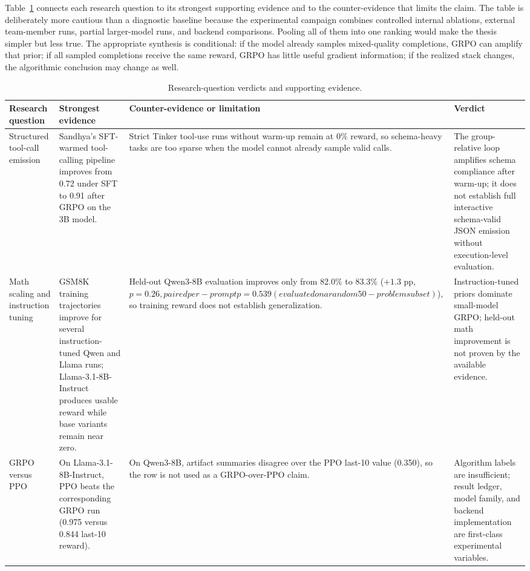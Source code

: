 \documentclass[12pt,a4paper]{report}
\begin{document}
Table~\ref{tab:rq-verdicts} connects each research question to its strongest supporting evidence and to the counter-evidence that limits the claim. The table is deliberately more cautious than a diagnostic baseline because the experimental campaign combines controlled internal ablations, external team-member runs, partial larger-model runs, and backend comparisons. Pooling all of them into one ranking would make the thesis simpler but less true. The appropriate synthesis is conditional: if the model already samples mixed-quality completions, GRPO can amplify that prior; if all sampled completions receive the same reward, GRPO has little useful gradient information; if the realized stack changes, the algorithmic conclusion may change as well.

\begin{table}[ht]
\centering
\caption{Research-question verdicts and supporting evidence.}
\label{tab:rq-verdicts}
\small
\footnotesize
\begin{tabularx}{\textwidth}{p{2.45cm}p{4.05cm}p{4.05cm}X}
\toprule
Research question & Strongest evidence & Counter-evidence or limitation & Verdict\\
\midrule
Structured tool-call emission & Sandhya's SFT-warmed tool-calling pipeline improves from 0.72 under SFT to 0.91 after GRPO on the 3B model. & Strict Tinker tool-use runs without warm-up remain at 0\% reward, so schema-heavy tasks are too sparse when the model cannot already sample valid calls. & The group-relative loop amplifies schema compliance after warm-up; it does not establish full interactive schema-valid JSON emission without execution-level evaluation.\\
Math scaling and instruction tuning & GSM8K training trajectories improve for several instruction-tuned Qwen and Llama runs; Llama-3.1-8B-Instruct produces usable reward while base variants remain near zero. & Held-out Qwen3-8B evaluation improves only from 82.0\% to 83.3\% ($+1.3$ pp, $p=0.26, paired per-prompt p=0.539 (evaluated on a random 50-problem subset)$), so training reward does not establish generalization. & Instruction-tuned priors dominate small-model GRPO; held-out math improvement is not proven by the available evidence.\\
GRPO versus PPO & On Llama-3.1-8B-Instruct, PPO beats the corresponding GRPO run (0.975 versus 0.844 last-10 reward). & On Qwen3-8B, artifact summaries disagree over the PPO last-10 value (0.350), so the row is not used as a GRPO-over-PPO claim. & Algorithm labels are insufficient; result ledger, model family, and backend implementation are first-class experimental variables.\\

\end{tabularx}
\end{table}
\end{document}
